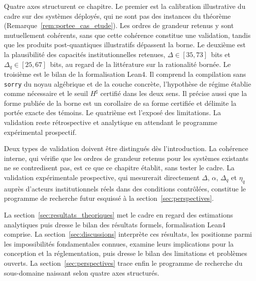 \begin{sloppypar}
Quatre axes structurent ce chapitre. Le premier est la calibration
illustrative du cadre sur des syst\`emes d\'eploy\'es, qui ne sont pas des
instances du th\'eor\`eme (Remarque~\ref{rem:portee_cas_etude}). Les ordres
de grandeur retenus y sont mutuellement coh\'erents, sans que cette
coh\'erence constitue une validation, tandis que les produits post-quantiques
illustratifs d\'epassent la borne. Le deuxi\`eme est la plausibilit\'e des
capacit\'es institutionnelles retenues, $\Delta \in [35, 73]$~bits et
$\Delta_q \in [25, 67]$~bits, au regard de la litt\'erature sur la
rationalit\'e born\'ee. Le troisi\`eme est le bilan de la formalisation
Lean4. Il comprend la compilation sans \texttt{sorry} du noyau alg\'ebrique et de la couche
concr\`ete, l'hypoth\`ese de r\'egime \'etablie comme n\'ecessaire et le seuil $H^\sharp$
certifi\'e dans les deux sens. Il pr\'ecise aussi que la forme publi\'ee de la borne est un
corollaire de sa forme certifi\'ee et d\'elimite la port\'ee exacte des t\'emoins. Le quatri\`eme est l'expos\'e
des limitations. La validation reste r\'etrospective et analytique en
attendant le programme exp\'erimental prospectif.

Deux types de validation doivent \^etre distingu\'es d\`es l'introduction. La coh\'erence interne, qui v\'erifie que les ordres de
grandeur retenus pour les syst\`emes existants ne se contredisent pas, est
ce que ce chapitre \'etablit, sans tester le cadre. La validation
exp\'erimentale prospective, qui mesurerait directement $\Delta$, $\alpha$,
$\Delta_q$ et $\eta_q$ aupr\`es d'acteurs institutionnels r\'eels
dans des conditions contr\^ol\'ees, constitue le programme de recherche
futur esquiss\'e \`a la section~\ref{sec:perspectives}.

La section~\ref{sec:resultats_theoriques} met le cadre en regard des
estimations analytiques puis dresse le bilan des r\'esultats formels, formalisation
Lean4 comprise. La section~\ref{sec:discussions} interpr\`ete
ces r\'esultats, les positionne parmi les impossibilit\'es fondamentales
connues, examine leurs implications pour la conception et la
r\'eglementation, puis dresse le bilan des limitations et
probl\`emes ouverts. La section~\ref{sec:perspectives} trace enfin le
programme de recherche du sous-domaine naissant selon quatre axes
structur\'es.

\end{sloppypar}